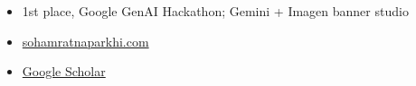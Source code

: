 \begin{itemize}
  \item 1st place, Google GenAI Hackathon; Gemini + Imagen banner studio
\end{itemize}

\medskip
{}
\begin{itemize}
  \item \href{https://sohamratnaparkhi.com}{sohamratnaparkhi.com}
  \item \href{https://scholar.google.com/citations?user=IRU_Fy4AAAAJ}{Google Scholar}
\end{itemize}
